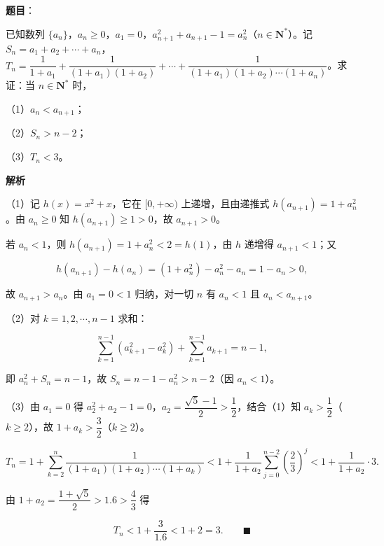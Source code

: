 \begin{answer}

\textbf{题目}：

已知数列 $\{a_n\}$，$a_n\geqslant0$，$a_1=0$，$a_{n+1}^2+a_{n+1}-1=a_n^2$（$n\in\mathbf N^*$）。记 $S_n=a_1+a_2+\cdots+a_n$，$T_n=\dfrac1{1+a_1}+\dfrac1{(1+a_1)(1+a_2)}+\cdots+\dfrac1{(1+a_1)(1+a_2)\cdots(1+a_n)}$。求证：当 $n\in\mathbf N^*$ 时，

（1）$a_n<a_{n+1}$；

（2）$S_n>n-2$；

（3）$T_n<3$。

\textbf{解析}

（1）记 $h(x)=x^2+x$，它在 $[0,+\infty)$ 上递增，且由递推式 $h(a_{n+1})=1+a_n^2$。由 $a_n\geqslant0$ 知 $h(a_{n+1})\geqslant1>0$，故 $a_{n+1}>0$。

若 $a_n<1$，则 $h(a_{n+1})=1+a_n^2<2=h(1)$，由 $h$ 递增得 $a_{n+1}<1$；又

\nopagebreak[4]
\[h(a_{n+1})-h(a_n)=\left(1+a_n^2\right)-a_n^2-a_n=1-a_n>0,\]

故 $a_{n+1}>a_n$。由 $a_1=0<1$ 归纳，对一切 $n$ 有 $a_n<1$ 且 $a_n<a_{n+1}$。

（2）对 $k=1,2,\cdots,n-1$ 求和：

\nopagebreak[4]
\[\sum_{k=1}^{n-1}\left(a_{k+1}^2-a_k^2\right)+\sum_{k=1}^{n-1}a_{k+1}=n-1,\]

即 $a_n^2+S_n=n-1$，故 $S_n=n-1-a_n^2>n-2$（因 $a_n<1$）。

（3）由 $a_1=0$ 得 $a_2^2+a_2-1=0$，$a_2=\dfrac{\sqrt5-1}2>\dfrac12$，结合（1）知 $a_k>\dfrac12$（$k\geqslant2$），故 $1+a_k>\dfrac32$（$k\geqslant2$）。

\nopagebreak[4]
\[T_n=1+\sum_{k=2}^n\frac1{(1+a_1)(1+a_2)\cdots(1+a_k)}
<1+\frac1{1+a_2}\sum_{j=0}^{n-2}\left(\frac23\right)^j
<1+\frac1{1+a_2}\cdot3.\]

由 $1+a_2=\dfrac{1+\sqrt5}2>1.6>\dfrac43$ 得

\nopagebreak[4]
\[T_n<1+\frac{3}{1.6}<1+2=3.\qquad\blacksquare\]


\end{answer}
